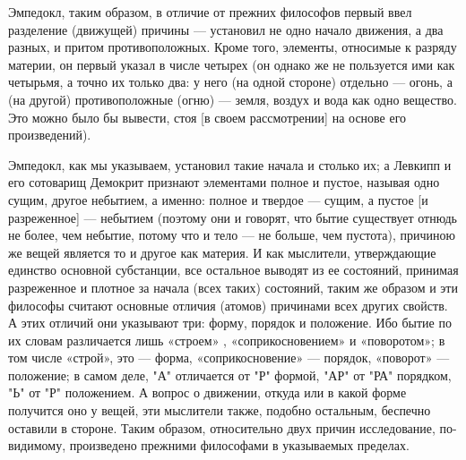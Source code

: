 \documentclass{article}
\begin{document}
Эмпедокл, таким образом, в отличие от прежних философов первый ввел разделение (движущей) причины
\footnotemark[4]
— установил не одно начало движения, а два разных, и притом противоположных. Кроме того, элементы, относимые к разряду материи, он первый указал в числе четырех (он однако же не пользуется ими как четырьмя, а точно их только два: у него (на одной стороне) отдельно — огонь, а (на другой) противоположные (огню) — земля, воздух и вода как одно вещество. Это можно было бы вывести, стоя [в своем рассмотрении] на основе его произведений).

Эмпедокл, как мы указываем, установил такие начала и столько их; а Левкипп и его сотоварищ Демокрит признают элементами полное и пустое, называя одно сущим, другое небытием, а именно: полное и твердое — сущим, а пустое [и разреженное]
\footnotemark[5]
— небытием (поэтому они и говорят, что бытие существует отнюдь не более, чем небытие, потому что и тело — не больше, чем пустота), причиною же вещей является то и другое как материя. И как мыслители, утверждающие единство основной субстанции, все остальное выводят из ее состояний, принимая разреженное и плотное за начала (всех таких) состояний, таким же образом и эти философы считают основные отличия (атомов) причинами всех других свойств. А этих отличий они указывают три: форму, порядок и положение. Ибо бытие по их словам различается лишь «строем»
\footnotemark[6]
, «соприкосновением» и «поворотом»; в том числе «строй», это — форма, «соприкосновение» — порядок, «поворот» — положение; в самом деле, "А" отличается от "Р" формой, "АР" от "РА" порядком, "Ь" от "Р" положением.
\footnotemark[7]
А вопрос о движении, откуда или в какой форме получится оно у вещей, эти мыслители также, подобно остальным, беспечно оставили в стороне. Таким образом, относительно двух причин исследование, по-видимому, произведено прежними философами в указываемых пределах.
\end{document}
